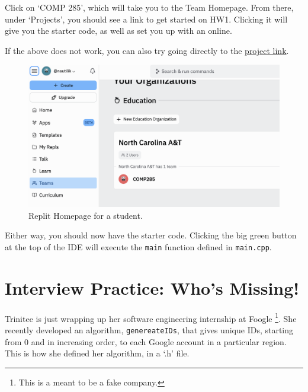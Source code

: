 \documentclass [12pt]{article}
\begin{document}
Click on `COMP 285', which will take you to the Team Homepage. From there, under `Projects', you should see a link to get started on HW1. Clicking it will give you the starter code, as well as set you up with an online. 

If the above does not work, you can also try going directly to the \href{https://replit.com/team/COMP285/HW1}{project link}.

\begin{figure}[h!]
\centering
\includegraphics[scale=0.5]{replit}
\caption{Replit Homepage for a student.}
\label{fig:replit_homepage}
\end{figure}

Either way, you should now have the starter code. Clicking the big green button at the top of the IDE will execute the \texttt{main} function defined in \texttt{main.cpp}.




\pagebreak
\section{Interview Practice: Who's Missing!}

 Trinitee is just wrapping up her software engineering internship at Foogle \footnote{This is a meant to be a fake company.}. She recently developed an algorithm, \texttt{genereateIDs}, that gives unique IDs, starting from $0$ and in increasing order, to each Google account in a particular region. This is how she defined her algorithm, in a `.h' file.

\vspace{2em}
\end{document}
